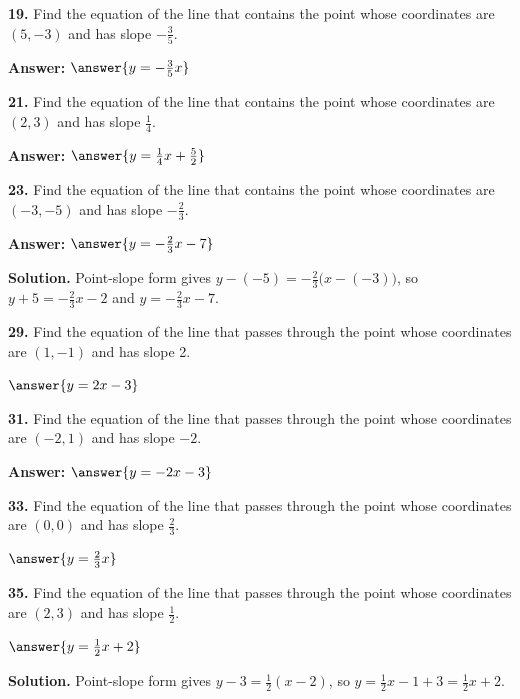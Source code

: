 \documentclass{ximera}
\begin{document}
\begin{problem}
\textbf{19.} Find the equation of the line that contains the point whose coordinates are
  $(5, -3)$ and has slope $-\frac{3}{5}$.

\textbf{Answer:} $\answer{y = -\frac{3}{5}x}$
\end{problem}

\begin{problem}
\textbf{21.} Find the equation of the line that contains the point whose coordinates are
  $(2, 3)$ and has slope $\frac{1}{4}$.

\textbf{Answer:} $\answer{y = \frac{1}{4}x +\frac{5}{2}}$
\end{problem}

\begin{problem}
\textbf{23.} Find the equation of the line that contains the point whose coordinates are
  $(-3, -5)$ and has slope $-\frac{2}{3}$.

\textbf{Answer:} $\answer{y = -\frac{2}{3}x -7}$

\begin{hint}
\textbf{Solution.} Point-slope form gives $y-(-5)=-\tfrac{2}{3}\bigl(x-(-3)\bigr)$, so $y+5=-\tfrac{2}{3}x-2$ and $y=-\tfrac{2}{3}x-7$.
\end{hint}
\end{problem}

\begin{problem}
\textbf{29.} Find the equation of the line that passes through the point whose coordinates are
  $(1, -1)$ and has slope 2.

$ \answer{y = 2x -3} $
\end{problem}

\begin{problem}
\textbf{31.} Find the equation of the line that passes through the point whose coordinates are
  $(-2, 1)$ and has slope $-2$.

\textbf{Answer:} $\answer{y = -2x -3} $
\end{problem}

\begin{problem}
\textbf{33.} Find the equation of the line that passes through the point whose coordinates are
  $(0, 0)$ and has slope $\frac{2}{3}$.

$ \answer{y = \frac{2}{3}x}$
\end{problem}

\begin{problem}
\textbf{35.} Find the equation of the line that passes through the point whose coordinates are
  $(2, 3)$ and has slope $\frac{1}{2}$.

$ \answer{y = \frac{1}{2}x +2} $

\begin{hint}
\textbf{Solution.} Point-slope form gives $y-3=\tfrac{1}{2}(x-2)$, so $y=\tfrac{1}{2}x-1+3=\tfrac{1}{2}x+2$.
\end{hint}
\end{problem}
\end{document}
